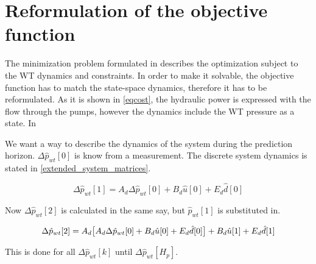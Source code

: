 \section{Reformulation of the objective function}
\label{ObjFunc_reform}

The minimization problem formulated in  describes the optimization subject to the WT dynamics and constraints. In order to make it solvable, the objective function has to match the state-space dynamics, therefore it has to be reformulated. As it is shown in \eqref{eqcost}, the hydraulic power is expressed with the flow through the pumps, however the dynamics include the WT pressure as a state. In 

We want a way to describe the dynamics of the system during the prediction horizon. $\Delta \hat p_{wt}[0]$ is know from a measurement. 
The discrete system dynamics is stated in \eqref{extended_system_matrices}.

\begin{equation}
	\Delta \hat p_{wt}[1] = A_d\Delta \hat p_{wt}[0] + B_d \hat u[0] + E_d \hat d[0]
\end{equation}

Now $\Delta \hat p_{wt}[2]$ is calculated in the same say, but $\hat p_{wt}[1]$ is substituted in. 

\begin{equation}
	\Delta \hat p_{wt}[2] = A_d\big[A_d\Delta \hat p_{wt}[0] + B_d \hat u[0] + E_d \hat d[0]\big] + B_d \hat u[1] + E_d \hat d[1]\\ 
\end{equation}

This is done for all $\Delta \hat p_{wt}[k]$ until $\Delta \hat p_{wt}[H_p]$. 


